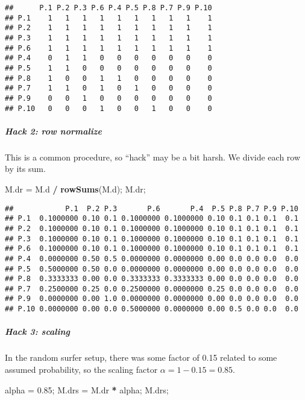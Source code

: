 \documentclass[
]{article}
\newenvironment{Shaded}{\begin{snugshade}}{\end{snugshade}}
\newcommand{\FloatTok}[1]{\textcolor[rgb]{0.00,0.00,0.81}{#1}}
\newcommand{\KeywordTok}[1]{\textcolor[rgb]{0.13,0.29,0.53}{\textbf{#1}}}
\newcommand{\NormalTok}[1]{#1}
\newcommand{\OperatorTok}[1]{\textcolor[rgb]{0.81,0.36,0.00}{\textbf{#1}}}
\newcommand{\StringTok}[1]{\textcolor[rgb]{0.31,0.60,0.02}{#1}}
\begin{document}
\begin{verbatim}
##      P.1 P.2 P.3 P.6 P.4 P.5 P.8 P.7 P.9 P.10
## P.1    1   1   1   1   1   1   1   1   1    1
## P.2    1   1   1   1   1   1   1   1   1    1
## P.3    1   1   1   1   1   1   1   1   1    1
## P.6    1   1   1   1   1   1   1   1   1    1
## P.4    0   1   1   0   0   0   0   0   0    0
## P.5    1   1   0   0   0   0   0   0   0    0
## P.8    1   0   0   1   1   0   0   0   0    0
## P.7    1   1   0   1   0   1   0   0   0    0
## P.9    0   0   1   0   0   0   0   0   0    0
## P.10   0   0   0   1   0   0   1   0   0    0
\end{verbatim}

\hypertarget{hack-2-row-normalize}{%
\subparagraph{Hack 2: row normalize}\label{hack-2-row-normalize}}

This is a common procedure, so ``hack'' may be a bit harsh. We divide
each row by its sum.

\begin{Shaded}
\begin{Highlighting}[]
\NormalTok{M.dr =}\StringTok{ }\NormalTok{M.d }\OperatorTok{/}\StringTok{ }\KeywordTok{rowSums}\NormalTok{(M.d);}
\NormalTok{M.dr;}
\end{Highlighting}
\end{Shaded}

\begin{verbatim}
##            P.1  P.2 P.3       P.6       P.4  P.5 P.8 P.7 P.9 P.10
## P.1  0.1000000 0.10 0.1 0.1000000 0.1000000 0.10 0.1 0.1 0.1  0.1
## P.2  0.1000000 0.10 0.1 0.1000000 0.1000000 0.10 0.1 0.1 0.1  0.1
## P.3  0.1000000 0.10 0.1 0.1000000 0.1000000 0.10 0.1 0.1 0.1  0.1
## P.6  0.1000000 0.10 0.1 0.1000000 0.1000000 0.10 0.1 0.1 0.1  0.1
## P.4  0.0000000 0.50 0.5 0.0000000 0.0000000 0.00 0.0 0.0 0.0  0.0
## P.5  0.5000000 0.50 0.0 0.0000000 0.0000000 0.00 0.0 0.0 0.0  0.0
## P.8  0.3333333 0.00 0.0 0.3333333 0.3333333 0.00 0.0 0.0 0.0  0.0
## P.7  0.2500000 0.25 0.0 0.2500000 0.0000000 0.25 0.0 0.0 0.0  0.0
## P.9  0.0000000 0.00 1.0 0.0000000 0.0000000 0.00 0.0 0.0 0.0  0.0
## P.10 0.0000000 0.00 0.0 0.5000000 0.0000000 0.00 0.5 0.0 0.0  0.0
\end{verbatim}

\hypertarget{hack-3-scaling}{%
\subparagraph{Hack 3: scaling}\label{hack-3-scaling}}

In the random surfer setup, there was some factor of 0.15 related to
some assumed probability, so the scaling factor
\(\alpha = 1-0.15 = 0.85\).

\begin{Shaded}
\begin{Highlighting}[]
\NormalTok{alpha =}\StringTok{ }\FloatTok{0.85}\NormalTok{;}
\NormalTok{M.drs =}\StringTok{ }\NormalTok{M.dr }\OperatorTok{*}\StringTok{ }\NormalTok{alpha;}
\NormalTok{M.drs;}
\end{Highlighting}
\end{Shaded}
\end{document}
